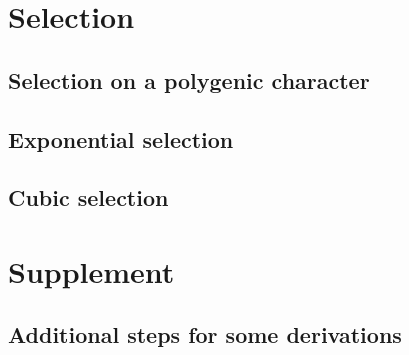 \documentclass{article}
\begin{document}
\section{Selection}
\subsection{Selection on a polygenic character}

\subsection{Exponential selection}

\subsection{Cubic selection}


\clearpage



\section{Supplement}
\subsection{Additional steps for some derivations}

\end{document}
